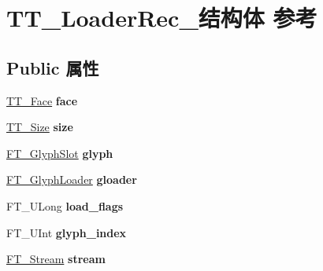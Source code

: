 \hypertarget{struct_t_t___loader_rec__}{}\section{T\+T\+\_\+\+Loader\+Rec\+\_\+结构体 参考}
\label{struct_t_t___loader_rec__}
\subsection*{Public 属性}
\begin{DoxyCompactItemize}
\item 
\mbox{\label{struct_t_t___loader_rec___abbccf35c9467ee5799e382ef5a70e36a}} 
\hyperlink{struct_t_t___face_rec__}{T\+T\+\_\+\+Face} {\bfseries face}
\item 
\mbox{\label{struct_t_t___loader_rec___a255a8fd4ceca32df819e320bb3f5b0c9}} 
\hyperlink{struct_t_t___size_rec__}{T\+T\+\_\+\+Size} {\bfseries size}
\item 
\mbox{\label{struct_t_t___loader_rec___a7843d7a665f8535faadf1bf1ec87b683}} 
\hyperlink{struct_f_t___glyph_slot_rec__}{F\+T\+\_\+\+Glyph\+Slot} {\bfseries glyph}
\item 
\mbox{\label{struct_t_t___loader_rec___a5c24ef5e731e4d9953be8ede99d6cf54}} 
\hyperlink{struct_f_t___glyph_loader_rec__}{F\+T\+\_\+\+Glyph\+Loader} {\bfseries gloader}
\item 
\mbox{\label{struct_t_t___loader_rec___a19ca6de6b384c1b6143275a485a3160f}} 
F\+T\+\_\+\+U\+Long {\bfseries load\+\_\+flags}
\item 
\mbox{\label{struct_t_t___loader_rec___a5486105cac09d372c0971c237585b135}} 
F\+T\+\_\+\+U\+Int {\bfseries glyph\+\_\+index}
\item 
\mbox{\label{struct_t_t___loader_rec___abb44841d62cecea6dd413be951eae241}} 
\hyperlink{struct_f_t___stream_rec__}{F\+T\+\_\+\+Stream} {\bfseries stream}
\item 
\mbox{\label{struct_t_t___loader_rec___a43c6befa8051373b8d18e6a60c6bee30}} 

\end{DoxyCompactItemize}
